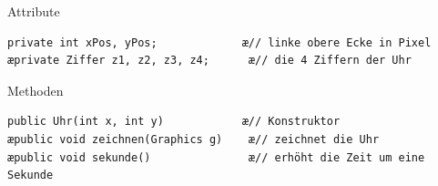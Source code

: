 \begin{compactenum}[a)]
\item Attribute

\begin{lstlisting}
private int xPos, yPos;             æ// linke obere Ecke in Pixel
æprivate Ziffer z1, z2, z3, z4;      æ// die 4 Ziffern der Uhr
\end{lstlisting}

\item Methoden

\begin{lstlisting}
public Uhr(int x, int y)            æ// Konstruktor
æpublic void zeichnen(Graphics g)    æ// zeichnet die Uhr
æpublic void sekunde()               æ// erhöht die Zeit um eine Sekunde
\end{lstlisting}
\end{compactenum}



